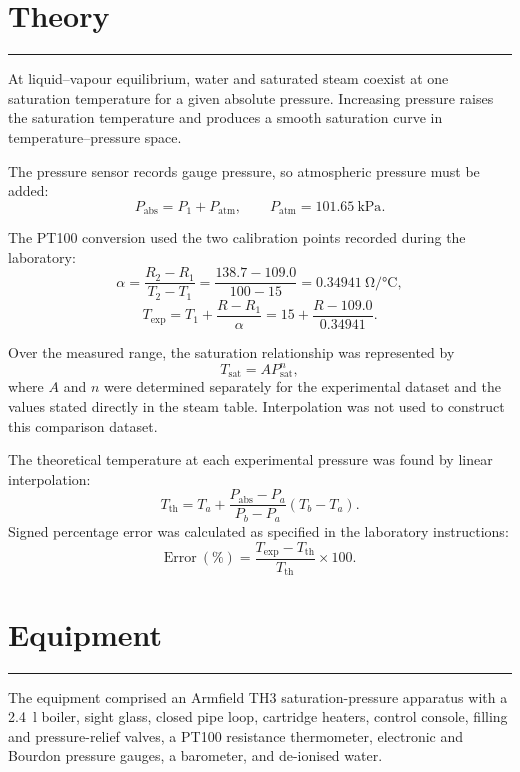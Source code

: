 \documentclass[11pt,a4paper]{article}
\newcommand{\sectionrule}{\vspace{-2pt}\color{rulegray}\hrule\color{black}\vspace{5pt}}
\begin{document}
\section{Theory}
\sectionrule
At liquid--vapour equilibrium, water and saturated steam coexist at one
saturation temperature for a given absolute pressure. Increasing pressure
raises the saturation temperature and produces a smooth saturation curve in
temperature--pressure space.

The pressure sensor records gauge pressure, so atmospheric pressure must be
added:
\begin{equation}
  P_{\mathrm{abs}}=P_1+P_{\mathrm{atm}},
  \qquad P_{\mathrm{atm}}=\SI{101.65}{\kilo\pascal}.
  \label{eq:pressure}
\end{equation}

The PT100 conversion used the two calibration points recorded during the
laboratory:
\begin{equation}
  \alpha=\frac{R_2-R_1}{T_2-T_1}
  =\frac{138.7-109.0}{100-15}
  =\SI{0.34941}{\ohm\per\degreeCelsius},
  \label{eq:alpha}
\end{equation}
\begin{equation}
  T_{\mathrm{exp}}=T_1+\frac{R-R_1}{\alpha}
  =15+\frac{R-109.0}{0.34941}.
  \label{eq:temperature}
\end{equation}

Over the measured range, the saturation relationship was represented by
\begin{equation}
  T_{\mathrm{sat}}=AP_{\mathrm{sat}}^n,
  \label{eq:power}
\end{equation}
where $A$ and $n$ were determined separately for the experimental dataset and
the values stated directly in the steam table. Interpolation was not used to
construct this comparison dataset.

The theoretical temperature at each experimental pressure was found by linear
interpolation:
\begin{equation}
  T_{\mathrm{th}}=T_a+
  \frac{P_{\mathrm{abs}}-P_a}{P_b-P_a}(T_b-T_a).
  \label{eq:interpolation}
\end{equation}
Signed percentage error was calculated as specified in the laboratory
instructions:
\begin{equation}
  \mathrm{Error}\ (\%)=
  \frac{T_{\mathrm{exp}}-T_{\mathrm{th}}}{T_{\mathrm{th}}}\times100.
  \label{eq:error}
\end{equation}

\section{Equipment}
\sectionrule
The equipment comprised an Armfield TH3 saturation-pressure apparatus with a
\SI{2.4}{\litre} boiler, sight glass, closed pipe loop, cartridge heaters,
control console, filling and pressure-relief valves, a PT100 resistance
thermometer, electronic and Bourdon pressure gauges, a barometer, and
de-ionised water.
\end{document}
